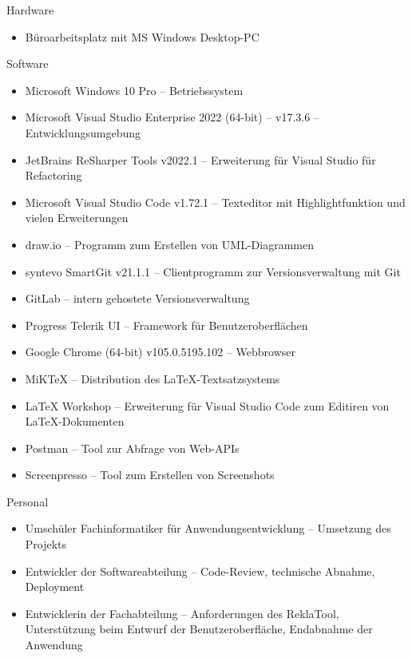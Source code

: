 Hardware
\begin{itemize}
    \item Büroarbeitsplatz mit MS Windows Desktop-PC
\end{itemize}
Software
\begin{itemize}
    \item Microsoft Windows 10 Pro -- Betriebssystem
    \item Microsoft Visual Studio Enterprise 2022 (64-bit) -- v17.3.6 -- Entwicklungsumgebung
    \item JetBrains ReSharper Tools v2022.1 -- Erweiterung für Visual Studio für \ua Refactoring
    \item Microsoft Visual Studio Code v1.72.1 -- Texteditor mit Highlightfunktion und vielen Erweiterungen
    \item draw.io -- Programm zum Erstellen von UML-Diagrammen
    \item syntevo SmartGit v21.1.1 -- Clientprogramm zur Versionsverwaltung mit Git
    \item GitLab -- intern gehostete Versionsverwaltung
    \item Progress Telerik UI -- Framework für Benutzeroberflächen
    \item Google Chrome (64-bit) v105.0.5195.102 -- Webbrowser
    \item MiKTeX -- Distribution des LaTeX-Textsatzsystems
    \item LaTeX Workshop -- Erweiterung für Visual Studio Code zum Editiren von LaTeX-Dokumenten
    \item Postman -- Tool zur Abfrage von Web-\acs{API}s
    \item Screenpresso -- Tool zum Erstellen von Screenshots
\end{itemize}
Personal
\begin{itemize}
    \item Umschüler Fachinformatiker für Anwendungsentwicklung -- Umsetzung des Projekts
    \item Entwickler der Softwareabteilung  -- Code-Review, technische Abnahme, Deployment
    \item Entwicklerin der Fachabteilung -- Anforderungen des ReklaTool, Unterstützung beim Entwurf der Benutzeroberfläche,
    Endabnahme der Anwendung
\end{itemize}